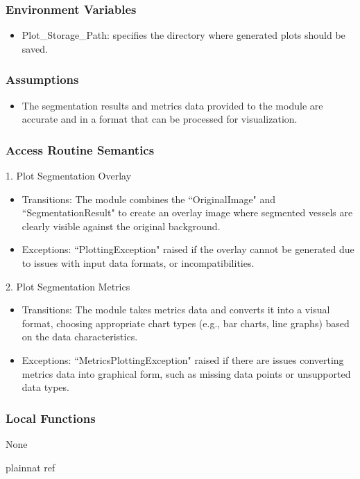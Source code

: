 \documentclass[12pt, titlepage]{article}
\begin{document}
\subsubsection{Environment Variables}
\begin{itemize}
    \item Plot\_Storage\_Path: specifies the directory where generated plots should be saved.
\end{itemize}

\subsubsection{Assumptions}
\begin{itemize}
    \item The segmentation results and metrics data provided to the module are accurate and in a format that can be processed for visualization.
\end{itemize}

\subsubsection{Access Routine Semantics}
1. Plot Segmentation Overlay
\begin{itemize}
    \item Transitions: The module combines the ``OriginalImage" and ``SegmentationResult" to create an overlay image where segmented vessels are clearly visible against the original background.
    \item Exceptions: ``PlottingException" raised if the overlay cannot be generated due to issues with input data formats, or incompatibilities.
\end{itemize}

2. Plot Segmentation Metrics
\begin{itemize}
    \item Transitions: The module takes metrics data and converts it into a visual format, choosing appropriate chart types (e.g., bar charts, line graphs) based on the data characteristics.
    \item Exceptions: ``MetricsPlottingException" raised if there are issues converting metrics data into graphical form, such as missing data points or unsupported data types.
\end{itemize}



\subsubsection{Local Functions}

None


\newpage
 {plainnat}
 {ref}
\end{document}
